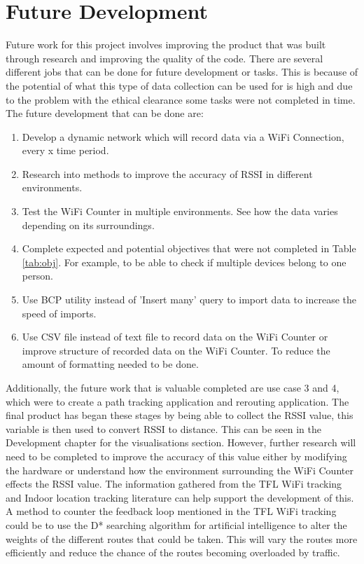 \documentclass{report}
\begin{document}
\chapter{Future Development}
Future work for this project involves improving the product that was built through research and improving the quality of the code. There are several different jobs that can be done for future development or tasks. This is because of the potential of what this type of data collection can be used for is high and due to the problem with the ethical clearance some tasks were not completed in time. The future development that can be done are:
\begin{enumerate}
    \item Develop a dynamic network which will record data via a WiFi Connection, every x time period. 
    \item Research into methods to improve the accuracy of RSSI in different environments.
    \item Test the WiFi Counter in multiple environments. See how the data varies depending on its surroundings.
    \item Complete expected and potential objectives that were not completed in Table \ref{tab:obj}. For example, to be able to check if multiple devices belong to one person. 
    \item Use BCP utility\cite{BCP} instead of 'Insert many' query to import data to increase the speed of imports.
    \item Use CSV file instead of text file to record data on the WiFi Counter or improve structure of recorded data on the WiFi Counter. To reduce the amount of formatting needed to be done. 
\end{enumerate}
Additionally, the future work that is valuable completed are use case 3 and 4, which were to create a path tracking application and rerouting application. The final product has began these stages by being able to collect the RSSI value, this variable is then used to convert RSSI to distance. This can be seen in the Development chapter for the visualisations section. However, further research will need to be completed to improve the accuracy of this value either by modifying the hardware or understand how the environment surrounding the WiFi Counter effects the RSSI value. The information gathered from the TFL WiFi tracking\cite{GizmodoLondon} and Indoor location tracking\cite{IndoorTrackingRSSI} literature can help support the development of this. A method to counter the feedback loop mentioned in the TFL WiFi tracking\cite{GizmodoLondon} could be to use the D* searching algorithm\cite{Dstar} for artificial intelligence to alter the weights of the different routes that could be taken. This will vary the routes more efficiently and reduce the chance of the routes becoming overloaded by traffic. \\ \newline
\end{document}
